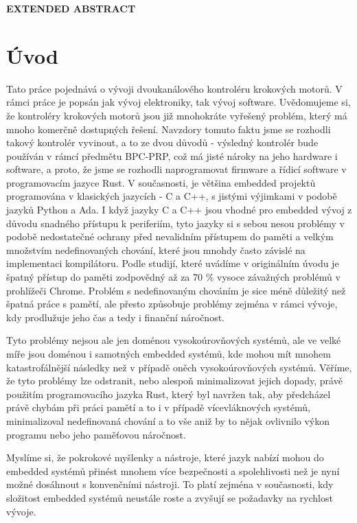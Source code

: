 \cleardoublepage
\noindent
{\large\sffamily\bfseries\MakeUppercase{Extended Abstract}}
\section*{Úvod}
Tato práce pojednává o vývoji dvoukanálového kontroléru krokových motorů.
V rámci práce je popsán jak vývoj elektroniky, tak vývoj software.
Uvědomujeme si, že kontroléry krokových motorů jsou již mnohokráte vyřešený problém, který má mnoho komerčně dostupných řešení.
Navzdory tomuto faktu jsme se rozhodli takový kontrolér vyvinout, a to ze dvou důvodů - výsledný kontrolér bude používán v rámcí předmětu BPC-PRP, což má jisté nároky na jeho hardware i software, a proto, že jsme se rozhodli naprogramovat firmware a řídicí software v programovacím jazyce Rust.
V současnosti, je většina embedded projektů programována v klasických jazycích - C a C++, s jistými výjimkami v podobě jazyků Python a Ada.
I když jazyky C a C++ jsou vhodné pro embedded vývoj z důvodu snadného přístupu k periferiím, tyto jazyky si s sebou nesou problémy v podobě nedostatečné ochrany před nevalidním přístupem do paměti a velkým množstvím nedefinovaných chování, které jsou mnohdy často závislé na implementaci kompilátoru.
Podle studijí, které uvádíme v originálním úvodu je špatný přístup do paměti zodpovědný až za 70 \% vysoce závažných problémů v prohlížeči Chrome.
Problém s nedefinovaným chováním je sice méně důležitý než špatná práce s pamětí, ale přesto způsobuje problémy zejména v rámci vývoje, kdy prodlužuje jeho čas a tedy i finanční náročnost.

Tyto problémy nejsou ale jen doménou vysokoúrovňových systémů, ale ve velké míře jsou doménou i samotných embedded systémů, kde mohou mít mnohem katastrofálnější následky než v případě oněch vysokoúrovňových systémů.
Věříme, že tyto problémy lze odstranit, nebo alespoň minimalizovat jejich dopady, právě použitím programovacího jazyka Rust, který byl navržen tak, aby předcházel právě chybám při práci pamětí a to i v případě vícevláknových systémů, minimalizoval nedefinovaná chování a to vše aniž by to nějak ovlivnilo výkon programu nebo jeho paměťovou náročnost.

Myslíme si, že pokrokové myšlenky a nástroje, které jazyk nabízí mohou do embedded systémů přinést mnohem více bezpečnosti a spolehlivosti než je nyní možné dosáhnout s konvenčními nástroji.
To platí zejména v současnosti, kdy složitost embedded systémů neustále roste a zvyšují se požadavky na rychlost vývoje.

